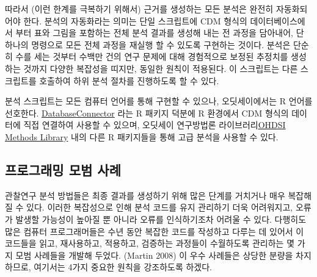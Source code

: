 \documentclass[10.5pt]{book}
\theoremstyle{definition}
\theoremstyle{definition}
\theoremstyle{definition}
\theoremstyle{remark}
\begin{document}
따라서 (이런 한계를 극복하기 위해서) 근거를 생성하는 모든 분석은 완전히
자동화되어야 한다. 분석의 자동화라는 의미는 단일 스크립트에 CDM 형식의
데이터베이스에서 부터 표와 그림을 포함하는 전체 분석 결과를 생성해 내는
전 과정을 담아내어, 단 하나의 명령으로 모든 전체 과정을 재실행 할 수
있도록 구현하는 것이다. 분석은 단순히 수를 세는 것부터 수백만 건의 연구
문제에 대해 경험적으로 보정된 추정치를 생성하는 것까지 다양한 복잡성을
띠지만, 동일한 원칙이 적용된다. 이 스크립트는 다른 스크립트를 호출하여
하위 분석 절차를 진행하도록 할 수 있다.

분석 스크립트는 모든 컴퓨터 언어를 통해 구현할 수 있으나, 오딧세이에서는
R 언어를 선호한다.
\href{https://ohdsi.github.io/DatabaseConnector/}{DatabaseConnector}
라는 R 패키지 덕분에 R 환경에서 CDM 형식의 데이터에 직접 연결하여 사용할
수 있으며, 오딧세이 연구방법론
라이브러리\href{https://ohdsi.github.io/MethodsLibrary/}{OHDSI Methods
Library} 내의 다른 R 패키지들을 통해 고급 분석을 사용할 수 있다.

\subsection{프로그래밍 모범 사례}\label{--}

관찰연구 분석 방법들은 최종 결과를 생성하기 위해 많은 단계를 거치거나
매우 복잡해질 수 있다. 이러한 복잡성으로 인해 분석 코드를 유지 관리하기
더욱 어려워지고, 오류가 발생할 가능성이 높아질 뿐 아니라 오류를
인식하기조차 어려울 수 있다. 다행히도 많은 컴퓨터 프로그래머들은 수년
동안 복잡한 코드를 작성하고 다루는 데 있어서 이 코드들을 읽고,
재사용하고, 적용하고, 검증하는 과정들이 수월하도록 관리하는 몇 가지 모범
사례들을 개발해 두었다. (Martin 2008) 이 우수 사례들은 상당한 분량을
차지하므로, 여기서는 4가지 중요한 원칙을 강조하도록 하겠다.
\end{document}
